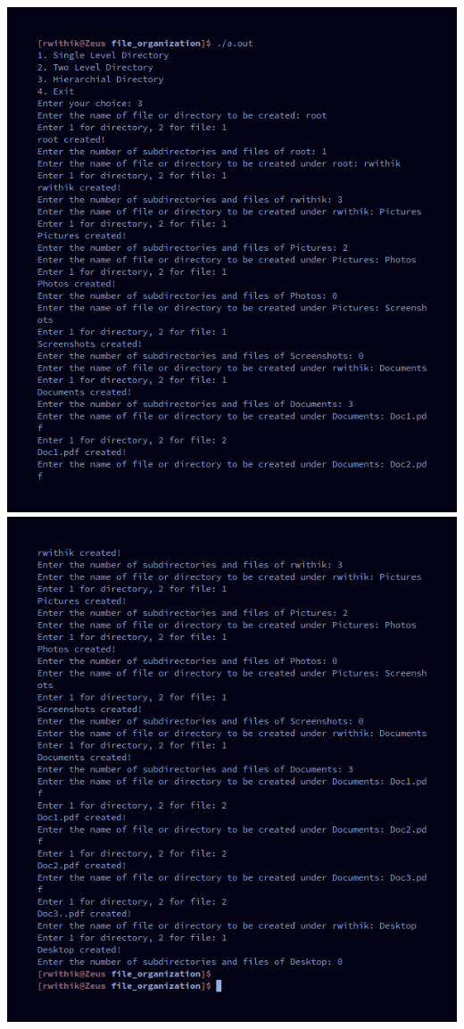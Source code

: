 \documentclass[10pt,a4paper,titlepage]{report}
\begin{document}
{\includegraphics[width=\linewidth]{../Images/file_organization/7.png}\newline
\includegraphics[width=\linewidth]{../Images/file_organization/8.png}\newline

}
\end{document}
